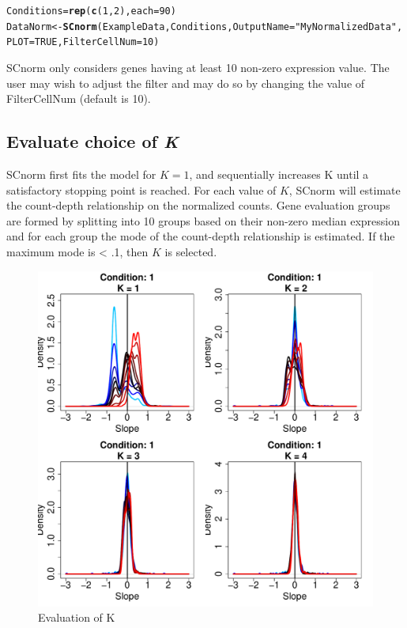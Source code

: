 \documentclass{article}\usepackage[]{graphicx}\usepackage[usenames,dvipsnames]{color}
\makeatletter
\newcommand{\hlnum}[1]{\textcolor[rgb]{0.686,0.059,0.569}{#1}}%
\newcommand{\hlstr}[1]{\textcolor[rgb]{0.192,0.494,0.8}{#1}}%
\newcommand{\hlstd}[1]{\textcolor[rgb]{0.345,0.345,0.345}{#1}}%
\newcommand{\hlkwb}[1]{\textcolor[rgb]{0.69,0.353,0.396}{#1}}%
\newcommand{\hlkwc}[1]{\textcolor[rgb]{0.333,0.667,0.333}{#1}}%
\newcommand{\hlkwd}[1]{\textcolor[rgb]{0.737,0.353,0.396}{\textbf{#1}}}%
\newenvironment{kframe}{%
 \def\at@end@of@kframe{}%
 \ifinner\ifhmode%
  \def\at@end@of@kframe{\end{minipage}}%
  \begin{minipage}{\columnwidth}%
 \fi\fi%
 \def\FrameCommand##1{\hskip\@totalleftmargin \hskip-\fboxsep
 \colorbox{shadecolor}{##1}\hskip-\fboxsep
     \hskip-\linewidth \hskip-\@totalleftmargin \hskip\columnwidth}%
 \MakeFramed {\advance\hsize-\width
   \@totalleftmargin\z@ \linewidth\hsize
   \@setminipage}}%
 {\par\unskip\endMakeFramed%
 \at@end@of@kframe}
\newenvironment{knitrout}{}{} %
\makeatother
\begin{document}
\begin{knitrout}
\color{fgcolor}\begin{kframe}
\begin{alltt}
\hlstd{Conditions} \hlkwb{=} \hlkwd{rep}\hlstd{(}\hlkwd{c}\hlstd{(}\hlnum{1}\hlstd{,}\hlnum{2}\hlstd{),} \hlkwc{each}\hlstd{=} \hlnum{90}\hlstd{)}
\hlstd{DataNorm} \hlkwb{<-} \hlkwd{SCnorm}\hlstd{(ExampleData, Conditions,} \hlkwc{OutputName} \hlstd{=} \hlstr{"MyNormalizedData"}\hlstd{,}
                     \hlkwc{PLOT}\hlstd{=}\hlnum{TRUE}\hlstd{,} \hlkwc{FilterCellNum} \hlstd{=} \hlnum{10}\hlstd{)}
\end{alltt}
\end{kframe}
\end{knitrout}
  
  SCnorm only considers genes having at least 10 non-zero expression value.
The user may wish to adjust the filter and may do so by changing the value of FilterCellNum (default is 10).


\subsection{Evaluate choice of \textit{K}}
\label{sec:NormalizationK}
SCnorm first fits the model for $K = 1$, and sequentially increases K until a satisfactory stopping point is reached. For each value of $K$, SCnorm will estimate the count-depth relationship on the normalized counts. Gene evaluation groups are formed by splitting into 10 groups based on their non-zero median expression and for each group the mode of the count-depth relationship is estimated. If the maximum mode is < .1, then $K$ is selected. 


\begin{figure}[h!]
\centering
\includegraphics[width=.5\textwidth]{MyNormalizedData_k_evaluation.pdf}
\caption{Evaluation of K}
\end{figure}
\end{document}
